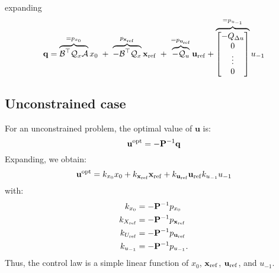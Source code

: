 \documentclass[a4paper,12pt,fleqn]{article}
\newcommand{\PQP}{\mathbf{P}}
\newcommand{\qQP}{\mathbf{q}}
\newcommand{\varxvec}{\mathbf{x}}
\newcommand{\varuvec}{\mathbf{u}}
\newcommand{\baru}{u_{-1}}
\begin{document}
expanding
\begin{equation}
 \qQP = \overbrace{\mathcal{B}^\top \mathcal{Q}_x\mathcal{A}}^{=p_{x_0}}x_0  \;+\; \overbrace{-\mathcal{B}^\top \mathcal{Q}_x}^{p_{\varxvec_{\rm ref}}}\varxvec_{\rm ref}\;+\; \overbrace{-\mathcal{Q}_u}^{=p_{\varuvec_{\rm ref}}}\varuvec_{\rm ref} + 
\overbrace{
  \begin{bmatrix}
 -Q_{\Delta u} \\ 0 \\ \vdots \\0
 \end{bmatrix}
}^{=p_{\baru}}
\baru
\end{equation}
\subsection{Unconstrained case}
For an unconstrained problem, the optimal value of $\varuvec$ is:
\begin{equation}
 \varuvec^{\rm opt} = -\PQP^{-1}\qQP
\end{equation}
Expanding, we obtain:
\begin{equation}
 \varuvec^{\rm opt} = k_{x_0} x_0 + k_{\varxvec_{\rm ref}}\varxvec_{\rm ref} + k_{\varuvec_{\rm ref}} \varuvec_{\rm ref} k_{\baru} \baru
\end{equation}
with:
\begin{subequations}
\begin{align}
k_{x_0} &= -\PQP^{-1}p_{x_0}\\
k_{X_{\rm ref}} &= -\PQP^{-1}p_{\varxvec_{\rm ref}}\\
k_{U_{\rm ref}} &= -\PQP^{-1}p_{\varuvec_{\rm ref}}\\
k_{\baru} &= -\PQP^{-1}p_{\baru}.
\end{align}
\end{subequations}
Thus, the control law is a simple linear function of $x_0$, $\varxvec_{\rm ref}$, $\varuvec_{\rm ref}$, and $u_{-1}$.
\end{document}
